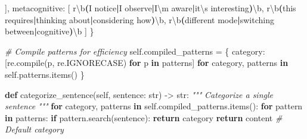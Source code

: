 \documentclass[
  11pt]{article}
\newenvironment{Shaded}{}{}
\newcommand{\BuiltInTok}[1]{\textcolor[rgb]{0.00,0.50,0.00}{#1}}
\newcommand{\CharTok}[1]{\textcolor[rgb]{0.25,0.44,0.63}{#1}}
\newcommand{\CommentTok}[1]{\textcolor[rgb]{0.38,0.63,0.69}{\textit{#1}}}
\newcommand{\ControlFlowTok}[1]{\textcolor[rgb]{0.00,0.44,0.13}{\textbf{#1}}}
\newcommand{\DecValTok}[1]{\textcolor[rgb]{0.25,0.63,0.44}{#1}}
\newcommand{\KeywordTok}[1]{\textcolor[rgb]{0.00,0.44,0.13}{\textbf{#1}}}
\newcommand{\NormalTok}[1]{#1}
\newcommand{\OperatorTok}[1]{\textcolor[rgb]{0.40,0.40,0.40}{#1}}
\newcommand{\StringTok}[1]{\textcolor[rgb]{0.25,0.44,0.63}{#1}}
\newcommand{\VariableTok}[1]{\textcolor[rgb]{0.10,0.09,0.49}{#1}}
\newcommand{\VerbatimStringTok}[1]{\textcolor[rgb]{0.25,0.44,0.63}{#1}}
\begin{document}
\begin{Shaded}
\begin{Highlighting}[]
\NormalTok{            ],}
            \StringTok{\textquotesingle{}metacognitive\textquotesingle{}}\NormalTok{: [}
                \VerbatimStringTok{r\textquotesingle{}}\DecValTok{\textbackslash{}b}\KeywordTok{(}\VerbatimStringTok{I notice}\ControlFlowTok{|}\VerbatimStringTok{I observe}\ControlFlowTok{|}\VerbatimStringTok{I}\CharTok{\textbackslash{}\textquotesingle{}}\VerbatimStringTok{m aware}\ControlFlowTok{|}\VerbatimStringTok{it}\CharTok{\textbackslash{}\textquotesingle{}}\VerbatimStringTok{s interesting}\KeywordTok{)}\DecValTok{\textbackslash{}b}\VerbatimStringTok{\textquotesingle{}}\NormalTok{,}
                \VerbatimStringTok{r\textquotesingle{}}\DecValTok{\textbackslash{}b}\KeywordTok{(}\VerbatimStringTok{this requires}\ControlFlowTok{|}\VerbatimStringTok{thinking about}\ControlFlowTok{|}\VerbatimStringTok{considering how}\KeywordTok{)}\DecValTok{\textbackslash{}b}\VerbatimStringTok{\textquotesingle{}}\NormalTok{,}
                \VerbatimStringTok{r\textquotesingle{}}\DecValTok{\textbackslash{}b}\KeywordTok{(}\VerbatimStringTok{different mode}\ControlFlowTok{|}\VerbatimStringTok{switching between}\ControlFlowTok{|}\VerbatimStringTok{cognitive}\KeywordTok{)}\DecValTok{\textbackslash{}b}\VerbatimStringTok{\textquotesingle{}}
\NormalTok{            ]}
\NormalTok{        \}}
        
        \CommentTok{\# Compile patterns for efficiency}
        \VariableTok{self}\NormalTok{.compiled\_patterns }\OperatorTok{=}\NormalTok{ \{}
\NormalTok{            category: [re.}\BuiltInTok{compile}\NormalTok{(p, re.IGNORECASE) }
                      \ControlFlowTok{for}\NormalTok{ p }\KeywordTok{in}\NormalTok{ patterns]}
            \ControlFlowTok{for}\NormalTok{ category, patterns }\KeywordTok{in} \VariableTok{self}\NormalTok{.patterns.items()}
\NormalTok{        \}}
    
    \KeywordTok{def}\NormalTok{ categorize\_sentence(}\VariableTok{self}\NormalTok{, sentence: }\BuiltInTok{str}\NormalTok{) }\OperatorTok{{-}\textgreater{}} \BuiltInTok{str}\NormalTok{:}
        \CommentTok{"""}
\CommentTok{        Categorize a single sentence}
\CommentTok{        """}
        \ControlFlowTok{for}\NormalTok{ category, patterns }\KeywordTok{in} \VariableTok{self}\NormalTok{.compiled\_patterns.items():}
            \ControlFlowTok{for}\NormalTok{ pattern }\KeywordTok{in}\NormalTok{ patterns:}
                \ControlFlowTok{if}\NormalTok{ pattern.search(sentence):}
                    \ControlFlowTok{return}\NormalTok{ category}
        \ControlFlowTok{return} \StringTok{\textquotesingle{}content\textquotesingle{}}  \CommentTok{\# Default category}
    

\end{Highlighting}
\end{Shaded}
\end{document}

